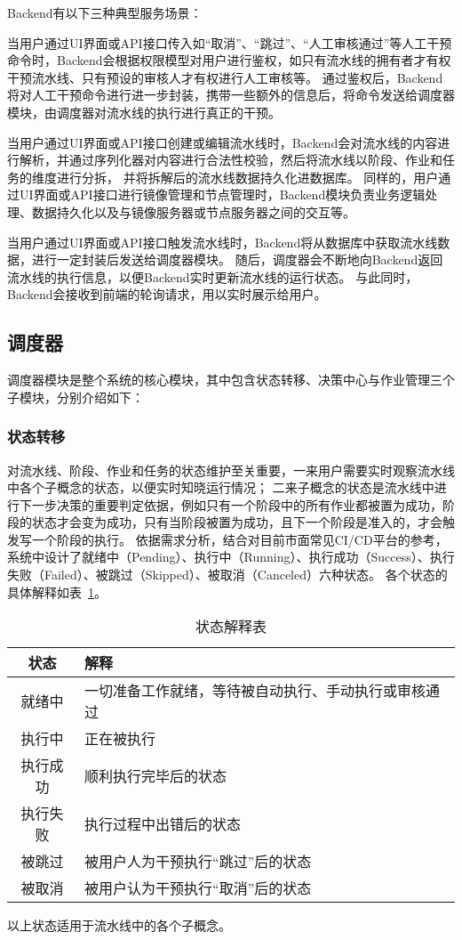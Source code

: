 Backend有以下三种典型服务场景：

当用户通过UI界面或API接口传入如“取消”、“跳过”、“人工审核通过”等人工干预命令时，Backend会根据权限模型对用户进行鉴权，如只有流水线的拥有者才有权干预流水线、只有预设的审核人才有权进行人工审核等。
通过鉴权后，Backend将对人工干预命令进行进一步封装，携带一些额外的信息后，将命令发送给调度器模块，由调度器对流水线的执行进行真正的干预。

当用户通过UI界面或API接口创建或编辑流水线时，Backend会对流水线的内容进行解析，并通过序列化器对内容进行合法性校验，然后将流水线以阶段、作业和任务的维度进行分拆，
并将拆解后的流水线数据持久化进数据库。
同样的，用户通过UI界面或API接口进行镜像管理和节点管理时，Backend模块负责业务逻辑处理、数据持久化以及与镜像服务器或节点服务器之间的交互等。

当用户通过UI界面或API接口触发流水线时，Backend将从数据库中获取流水线数据，进行一定封装后发送给调度器模块。
随后，调度器会不断地向Backend返回流水线的执行信息，以便Backend实时更新流水线的运行状态。
与此同时，Backend会接收到前端的轮询请求，用以实时展示给用户。

\subsection{调度器}

调度器模块是整个系统的核心模块，其中包含状态转移、决策中心与作业管理三个子模块，分别介绍如下：

\subsubsection{状态转移}

对流水线、阶段、作业和任务的状态维护至关重要，一来用户需要实时观察流水线中各个子概念的状态，以便实时知晓运行情况；
二来子概念的状态是流水线中进行下一步决策的重要判定依据，例如只有一个阶段中的所有作业都被置为成功，阶段的状态才会变为成功，只有当阶段被置为成功，且下一个阶段是准入的，才会触发写一个阶段的执行。
依据需求分析，结合对目前市面常见CI/CD平台的参考，系统中设计了就绪中（Pending）、执行中（Running）、执行成功（Success）、执行失败（Failed）、被跳过（Skipped）、被取消（Canceled）六种状态。
各个状态的具体解释如表~\ref{tab:状态解释表}。
\begin{table}[h]
  \centering
  \caption{状态解释表}
  \label{tab:状态解释表}
  \begin{tabular}{cl}
    \toprule
    状态           & 解释                                     \\
    \midrule
    就绪中         & 一切准备工作就绪，等待被自动执行、手动执行或审核通过\\
    执行中         & 正在被执行                 \\
    执行成功       & 顺利执行完毕后的状态        \\
    执行失败       & 执行过程中出错后的状态       \\
    被跳过         & 被用户人为干预执行“跳过”后的状态         \\
    被取消         & 被用户认为干预执行“取消”后的状态         \\
    \bottomrule
  \end{tabular}
\end{table}
以上状态适用于流水线中的各个子概念。

